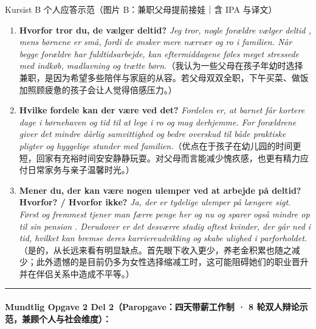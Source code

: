\begin{grammatikbox}{Kursist B 个人应答示范（图片 B：兼职父母提前接娃｜含 IPA 与译文）}
\small
\begin{enumerate}
  \item \textbf{Hvorfor tror du, de vælger deltid?} \textit{Jeg tror, nogle forældre vælger deltid , mens børnene er små, fordi de ønsker mere nærvær og ro i familien. Når begge forældre har fuldtidsarbejde, kan eftermiddagene føles meget stressede med indkøb, madlavning og trætte børn.}（我认为一些父母在孩子年幼时选择兼职，是因为希望多些陪伴与家庭的从容。若父母双双全职，下午买菜、做饭加照顾疲惫的孩子会让人觉得倍感压力。）
  \item \textbf{Hvilke fordele kan der være ved det?} \textit{Fordelen er, at barnet får kortere dage i børnehaven og tid til at lege i ro og mag derhjemme. For forældrene giver det mindre dårlig samvittighed  og bedre overskud til både praktiske pligter og hyggelige stunder med familien.}（优点在于孩子在幼儿园的时间更短，回家有充裕时间安安静静玩耍。对父母而言能减少愧疚感，也更有精力应付日常家务与亲子温馨时光。）
  \item \textbf{Mener du, der kan være nogen ulemper ved at arbejde på deltid? Hvorfor? / Hvorfor ikke?} \textit{Ja, der er tydelige ulemper på længere sigt. Først og fremmest tjener man færre penge her og nu og sparer også mindre op til sin pension . Derudover er det desværre stadig oftest kvinder, der går ned i tid, hvilket kan bremse deres karriereudvikling og skabe ulighed i parforholdet.}（是的，从长远来看有明显缺点。首先眼下收入更少，养老金积累也随之减少；此外遗憾的是目前仍多为女性选择缩减工时，这可能阻碍她们的职业晋升并在伴侣关系中造成不平等。）
\end{enumerate}
\end{grammatikbox}

\vspace{0.35em}
\hrule
\vspace{0.35em}
\paragraph*{Mundtlig Opgave 2 Del 2（Paropgave：四天带薪工作制 · 8 轮双人辩论示范，兼顾个人与社会维度）：}

